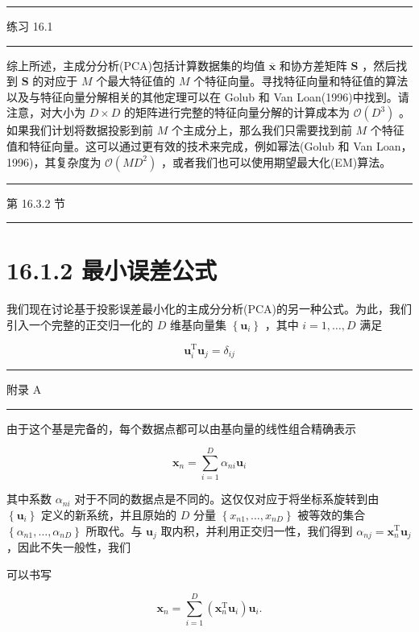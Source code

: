 \documentclass[10pt]{article}
\newcommand{\HRule}{\begin{center}\rule{0.9\linewidth}{0.2mm}\end{center}}
\begin{document}
\HRule

练习 16.1

\HRule

综上所述，主成分分析(PCA)包括计算数据集的均值 \(\overline{\mathbf{x}}\) 和协方差矩阵 \(\mathbf{S}\) ，然后找到 \(\mathbf{S}\) 的对应于 \(M\) 个最大特征值的 \(M\) 个特征向量。寻找特征向量和特征值的算法以及与特征向量分解相关的其他定理可以在 Golub 和 Van Loan(1996)中找到。请注意，对大小为 \(D \times  D\) 的矩阵进行完整的特征向量分解的计算成本为 \(\mathcal{O}\left( {D}^{3}\right)\) 。如果我们计划将数据投影到前 \(M\) 个主成分上，那么我们只需要找到前 \(M\) 个特征值和特征向量。这可以通过更有效的技术来完成，例如幂法(Golub 和 Van Loan，1996)，其复杂度为 \(\mathcal{O}\left( {M{D}^{2}}\right)\) ，或者我们也可以使用期望最大化(EM)算法。

\HRule

第 16.3.2 节

\HRule

\section*{16.1.2 最小误差公式}

我们现在讨论基于投影误差最小化的主成分分析(PCA)的另一种公式。为此，我们引入一个完整的正交归一化的 \(D\) 维基向量集 \(\left\{  {\mathbf{u}}_{i}\right\}\) ，其中 \(i = 1,\ldots ,D\) 满足

\[
{\mathbf{u}}_{i}^{\mathrm{T}}{\mathbf{u}}_{j} = {\delta }_{ij} \tag{16.7}
\]

\HRule

附录 A

\HRule

由于这个基是完备的，每个数据点都可以由基向量的线性组合精确表示

\[
{\mathbf{x}}_{n} = \mathop{\sum }\limits_{{i = 1}}^{D}{\alpha }_{ni}{\mathbf{u}}_{i} \tag{16.8}
\]

其中系数 \({\alpha }_{ni}\) 对于不同的数据点是不同的。这仅仅对应于将坐标系旋转到由 \(\left\{  {\mathbf{u}}_{i}\right\}\) 定义的新系统，并且原始的 \(D\) 分量 \(\left\{  {{x}_{n1},\ldots ,{x}_{nD}}\right\}\) 被等效的集合 \(\left\{  {{\alpha }_{n1},\ldots ,{\alpha }_{nD}}\right\}\) 所取代。与 \({\mathbf{u}}_{j}\) 取内积，并利用正交归一性，我们得到 \({\alpha }_{nj} = {\mathbf{x}}_{n}^{\mathrm{T}}{\mathbf{u}}_{j}\) ，因此不失一般性，我们

可以书写

\[
{\mathbf{x}}_{n} = \mathop{\sum }\limits_{{i = 1}}^{D}\left( {{\mathbf{x}}_{n}^{\mathrm{T}}{\mathbf{u}}_{i}}\right) {\mathbf{u}}_{i}. \tag{16.9}
\]
\end{document}
